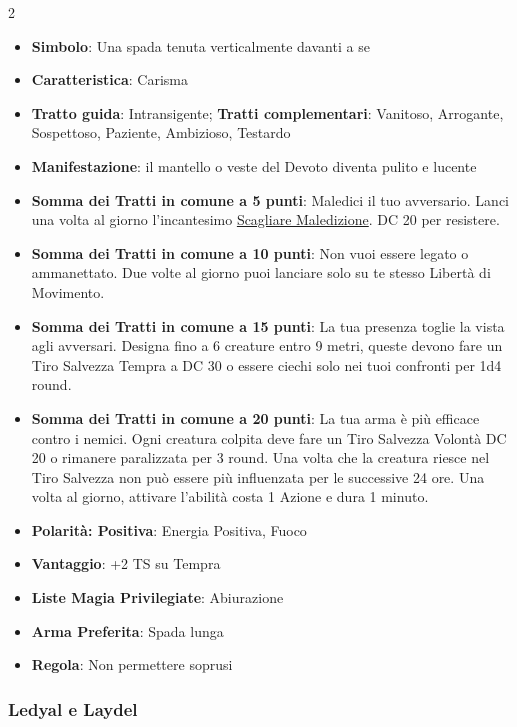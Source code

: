 \begin{multicols}{2}
\begin{itemize}[leftmargin=*] \setlength{\itemsep}{0pt}
\item \textbf{Simbolo}: Una spada tenuta verticalmente davanti a se
\item \textbf{Caratteristica}: Carisma
\item \textbf{Tratto guida}: Intransigente; \textbf{Tratti complementari}: Vanitoso, Arrogante, Sospettoso, Paziente, Ambizioso, Testardo
\item \textbf{Manifestazione}: il mantello o veste del Devoto diventa pulito e lucente
\item \textbf{Somma dei Tratti in comune a 5 punti}: Maledici il tuo avversario. Lanci una volta al giorno l'incantesimo \hyperlink{Scagliare Maledizione}{Scagliare Maledizione}. DC 20 per resistere.
\item \textbf{Somma dei Tratti in comune a 10 punti}: Non vuoi essere legato o ammanettato. Due volte al giorno puoi lanciare solo su te stesso Libertà di Movimento.
\item \textbf{Somma dei Tratti in comune a 15 punti}: La tua presenza toglie la vista agli avversari. Designa fino a 6 creature entro 9 metri, queste devono fare un Tiro Salvezza Tempra a DC 30 o essere ciechi solo nei tuoi confronti per 1d4 round.
\item \textbf{Somma dei Tratti in comune a 20 punti}: La tua arma è più efficace contro i nemici. Ogni creatura colpita deve fare un Tiro Salvezza Volontà DC 20 o rimanere paralizzata per 3 round. Una volta che la creatura riesce nel Tiro Salvezza non può essere più influenzata per le successive 24 ore. Una volta al giorno, attivare l'abilità costa 1 Azione e dura 1 minuto.
\item \textbf{Polarità: Positiva}: Energia Positiva, Fuoco
\item \textbf{Vantaggio}: +2 TS su Tempra
\item \textbf{Liste Magia Privilegiate}: Abiurazione
\item \textbf{Arma Preferita}: Spada lunga
\item \textbf{Regola}: Non permettere soprusi
\end{itemize}

\subsubsection{Ledyal e Laydel}\label{ledyal}\label{laydel}\hypertarget{ledyal}{} \hypertarget{laydel}{}


\end{multicols}
